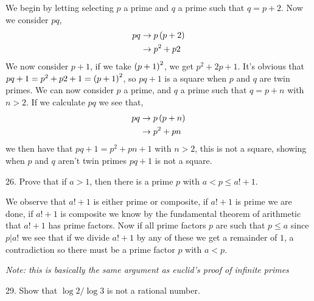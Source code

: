 \begin{mdframed}[style=darkAnswer,frametitle={Joe Starr}]
    We begin by letting selecting $p$ a prime and $q$ a prime such that $q=p+2$. 
    Now we consider $pq$, 
    \begin{align*}
        pq  &\rightarrow p\left(p+2\right)\\
            &\rightarrow p^2+p2\\
    \end{align*}
    We now consider $p+1$, if we take $\left(p+1\right)^2$, we get $p^2+2p+1$. It's 
    obvious that $pq+1=p^2+p2+1=\left(p+1\right)^2$, so $pq+1$ is a square when $p$ and $q$ are 
    twin primes. 
    We can now consider $p$ a prime, and $q$ a prime such that $q=p+n$ with 
    $n>2$. If we calculate $pq$ we see that,
    \begin{align*}
        pq  &\rightarrow p\left(p+n\right)\\
            &\rightarrow p^2+pn\\
    \end{align*}
    we then have that $pq+1=p^2+pn+1$ with $n>2$, this is not a square, showing 
    when $p$ and $q$ aren't twin primes $pq+1$ is not a square. 
\end{mdframed}
\newpage
\begin{mdframed}[style=darkQuesion]
26. Prove that if $a>1$, then there is a prime $p$ with $a<p\leq a!+1$.
\end{mdframed}

\begin{mdframed}[style=darkAnswer,frametitle={Joe Starr}]
    We observe that $a!+1$ is either prime or composite, if $ a!+1$ is prime
    we are done, if $ a!+1$ is composite we know by the fundamental theorem
    of arithmetic that $ a!+1$ has prime factors. Now if all prime factors $p$
    are such that $p\leq a$ since $p\vert a!$ we see that if we divide $a!+1$ by
    any of these we get a remainder of $1$, a contradiction so there must be 
    a prime factor $p$ with $a<p$.

    \textit{Note: this is basically the same argument as euclid's proof of 
    infinite primes}
\end{mdframed}
\newpage
\begin{mdframed}[style=darkQuesion]
29. Show that $\log{2}/\log{3}$ is not a rational number. 
\end{mdframed}

